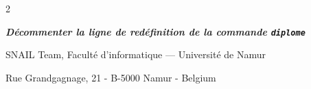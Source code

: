 \documentclass[a4paper,11pt]{book}
\newcommand{\diplome}{\textbf\textit{{Décommenter la ligne de redéfinition de la commande \texttt{diplome}}}}
\begin{document}
  \vspace{0.5cm}

  \begin{center}
        \begin{minipage}[c][5cm]{9.6cm}
            \begin{spacing}{2}
                \begin{center}
                    \vspace{6.4cm}
                    \centerline{\large\diplome}
                    \vspace{1.6cm}
                    \centerline{ SNAIL Team, Faculté d'informatique --- Université de Namur }
                    \centerline{ Rue Grandgagnage, 21 - B-5000 Namur  - Belgium }
                \end{center}
            \end{spacing}
        \end{minipage}
  \end{center}

\clearpage

\thispagestyle{empty}
\newpage
\pagestyle{headings}

\frontmatter




\tableofcontents


\mainmatter









\appendix 





\end{document}
